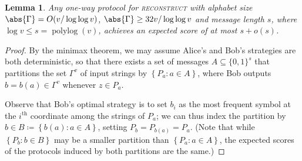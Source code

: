\documentclass[10pt,a4paper]{article}
\newtheorem{lemma}[theorem]{Lemma}
\theoremstyle{definition}
\renewcommand{\set}[1]{\left\{#1\right\}}
\newcommand{\polylog}{\operatorname{polylog}}
\newcommand{\bitset}{\{0,1\}}
\newcommand{\reconstruct}{\normalfont\textsc{reconstruct}\xspace}
\newcommand{\vcommitlength}{v}
\newcommand{\vcommitstring}{z}
\newcommand{\alphabet}{\Gamma}
\begin{document}
\begin{lemma}
    \label{lem:reconstruct-bound}
    Any one-way protocol for \reconstruct with alphabet size $\abs{\alphabet} = O(\vcommitlength / \log\log \vcommitlength)$, $\abs{\alphabet} \geq 32\vcommitlength / \log\log \vcommitlength$ and message length $s$, where $\log \vcommitlength \leq s = \polylog(\vcommitlength)$, achieves an expected score of at most $s + o(s)$.
\end{lemma}
\begin{proof}
    By the minimax theorem, we may assume Alice's and Bob's strategies are both deterministic, so that there exists a set of messages $A \subseteq \bitset^s$ that partitions the set $\alphabet^\vcommitlength$ of input strings by $\set{P_a : a \in A}$, where Bob outputs $b = b(a) \in \alphabet^\vcommitlength$ whenever $\vcommitstring \in P_a$.
    
    Observe that Bob's optimal strategy is to set $b_i$ as the most frequent symbol at the $i^\text{th}$  coordinate among the strings of $P_a$; we can thus index the partition by $b \in B \coloneqq \set{b(a) : a \in A}$, setting $P_b = P_{b(a)} = P_a$. (Note that while $\set{P_b : b \in B}$ may be a smaller partition than $\set{P_a : a \in A}$, the expected scores of the protocols induced by both partitions are the same.)
    

\end{proof}
\end{document}
